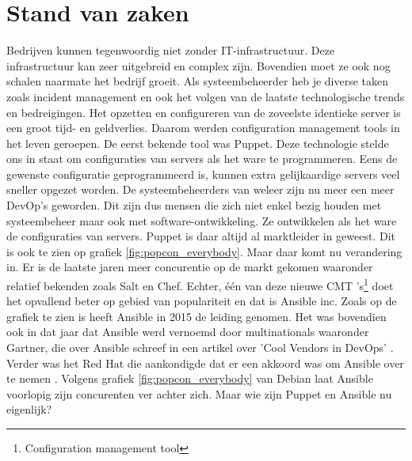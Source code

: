 \section{Stand van zaken}
\label{sec:stand-van-zaken}
Bedrijven kunnen tegenwoordig niet zonder IT-infrastructuur. Deze infrastructuur kan zeer uitgebreid en complex zijn. Bovendien moet ze ook nog schalen naarmate het bedrijf groeit. Als systeembeheerder heb je diverse taken zoals incident management en ook 
het volgen van de laatste technologische trends en bedreigingen. Het opzetten en configureren van de zoveelste identieke server is een groot tijd- en geldverlies. Daarom werden configuration management tools in het leven geroepen. De eerst bekende tool was Puppet. Deze technologie stelde ons in staat om configuraties van servers als het ware te programmeren. Eens de gewenste configuratie geprogrammeerd is, kunnen extra gelijkaardige servers veel sneller opgezet worden. De systeembeheerders van weleer zijn nu meer een meer DevOp's geworden. Dit zijn dus mensen die zich niet enkel bezig houden met systeembeheer maar ook met software-ontwikkeling. Ze ontwikkelen als het ware de configuraties van servers. Puppet is daar altijd al marktleider in geweest. Dit is ook te zien op grafiek \ref{fig:popcon_everybody}. Maar daar komt nu verandering in. Er is de laatste jaren meer concurentie op de markt gekomen waaronder relatief bekenden zoals Salt en Chef. 
Echter,  \'e\'en van deze nieuwe CMT 's\footnote{Configuration management tool} doet het opvallend beter op gebied van populariteit en dat is Ansible inc. Zoals op de grafiek te zien is heeft Ansible in 2015 de leiding genomen. Het was bovendien ook in dat jaar dat Ansible werd vernoemd door multinationals waaronder Gartner, die over Ansible schreef in een artikel over  'Cool Vendors in DevOps' \autocite{coolvendors}. Verder was het Red Hat die aankondigde dat er een akkoord was om Ansible over te nemen \autocite{redhatovername}. Volgens grafiek  \ref{fig:popcon_everybody} van Debian laat Ansible voorlopig zijn concurenten ver achter zich. Maar wie zijn Puppet en Ansible nu eigenlijk?

